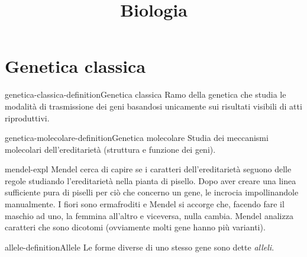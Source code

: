 \documentclass[preview]{standalone}
\begin{document}
\title{Biologia}
\genpage

\section{Genetica classica}

\begin{snippetdefinition}{genetica-classica-definition}{Genetica classica}
    Ramo della genetica che studia le modalità di trasmissione
    dei geni basandosi unicamente sui risultati visibili di atti riproduttivi.
\end{snippetdefinition}

\begin{snippetdefinition}{genetica-molecolare-definition}{Genetica molecolare}
    Studia dei meccanismi molecolari dell'ereditarietà (struttura e funzione dei geni).
\end{snippetdefinition}

%


\begin{snippet}{mendel-expl}
    Mendel cerca di capire se i caratteri dell'ereditarietà
    seguono delle regole studiando l'ereditarietà nella pianta di pisello.
    Dopo aver creare una linea sufficiente pura di piselli per ciò che concerno un gene,
    le incrocia impollinandole manualmente.
    I fiori sono ermafroditi e Mendel si accorge che, facendo fare il maschio ad uno, la femmina all'altro
    e viceversa, nulla cambia.
    Mendel analizza caratteri che sono dicotomi (ovviamente molti gene hanno più varianti).
\end{snippet}

\begin{snippetdefinition}{allele-definition}{Allele}
    Le forme diverse di uno stesso gene sono dette \textit{alleli}.
\end{snippetdefinition}
\end{document}
